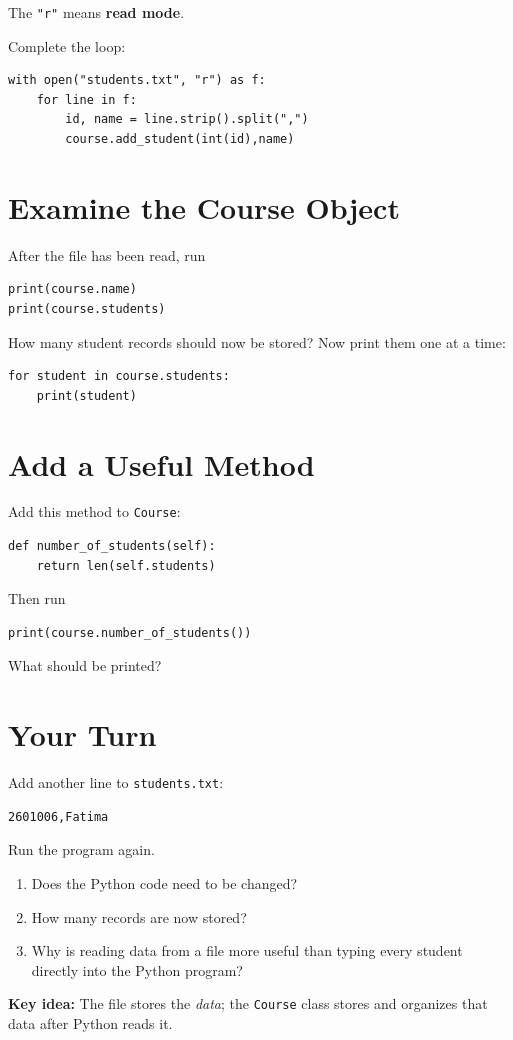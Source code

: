 \documentclass[11pt]{article}
\begin{document}
The \texttt{"r"} means \textbf{read mode}.

Complete the loop:

\begin{verbatim}
with open("students.txt", "r") as f:
    for line in f:
        id, name = line.strip().split(",")
        course.add_student(int(id),name)
\end{verbatim}

\vspace{0.3cm}

\section{Examine the Course Object}

After the file has been read, run

\begin{verbatim}
print(course.name)
print(course.students)
\end{verbatim}

How many student records should now be stored?  Now print them one at a time:

\begin{verbatim}
for student in course.students:
    print(student)
\end{verbatim}

\section{Add a Useful Method}

Add this method to \texttt{Course}:

\begin{verbatim}
def number_of_students(self):
    return len(self.students)
\end{verbatim}

Then run

\begin{verbatim}
print(course.number_of_students())
\end{verbatim}

What should be printed?

\section{Your Turn}

Add another line to \texttt{students.txt}:

\begin{verbatim}
2601006,Fatima
\end{verbatim}

Run the program again.

\begin{enumerate}
\item Does the Python code need to be changed?
\item How many records are now stored?
\item Why is reading data from a file more useful than typing every
student directly into the Python program?
\end{enumerate}

\vspace{0.25cm}
\noindent
\textbf{Key idea:} The file stores the \emph{data}; the
\texttt{Course} class stores and organizes that data after Python
reads it.
\end{document}
